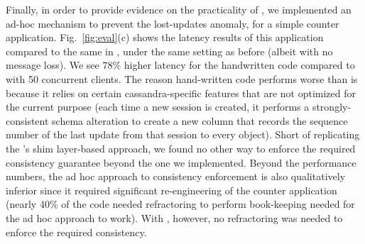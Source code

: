 Finally, in order to provide evidence on the practicality of \tool, we
implemented an ad-hoc mechanism to prevent the lost-updates anomaly,
for a simple counter application. Fig.~\ref{fig:eval}(c) shows the
latency results of this application compared to the same in \tool,
under the same setting as before (albeit with no message loss).  We
see $78\%$ higher latency for the handwritten code compared to \tool
with 50 concurrent clients. The reason hand-written code performs
worse than \tool is because it relies on certain cassandra-specific
features that are not optimized for the current purpose (each time a
new session is created, it performs a strongly-consistent schema
alteration to create a new column that records the sequence number of
the last update from that session to every object).  Short of
replicating the \tool's shim layer-based approach, we found no other
way to enforce the required consistency guarantee beyond the one we
implemented. Beyond the performance numbers, the ad hoc approach to
consistency enforcement is also qualitatively inferior since it
required significant re-engineering of the counter application (nearly
40\% of the code needed refractoring to perform book-keeping needed
for the ad hoc approach to work). With \tool, however, no refractoring
was needed to enforce the required consistency.










































